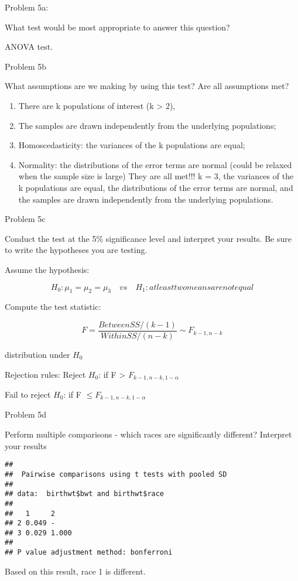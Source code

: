 \documentclass[
]{article}
\newenvironment{Shaded}{\begin{snugshade}}{\end{snugshade}}
\newcommand{\AttributeTok}[1]{\textcolor[rgb]{0.13,0.29,0.53}{#1}}
\newcommand{\FunctionTok}[1]{\textcolor[rgb]{0.13,0.29,0.53}{\textbf{#1}}}
\newcommand{\NormalTok}[1]{#1}
\newcommand{\SpecialCharTok}[1]{\textcolor[rgb]{0.81,0.36,0.00}{\textbf{#1}}}
\newcommand{\StringTok}[1]{\textcolor[rgb]{0.31,0.60,0.02}{#1}}
\providecommand{\tightlist}{%
  \setlength{\itemsep}{0pt}\setlength{\parskip}{0pt}}
\begin{document}
Problem 5a:

What test would be most appropriate to answer this question?

ANOVA test.

Problem 5b

What assumptions are we making by using this test? Are all assumptions
met?

\begin{enumerate}
\def\labelenumi{\arabic{enumi}.}
\tightlist
\item
  There are k populations of interest (k \textgreater{} 2),
\item
  The samples are drawn independently from the underlying populations;
\item
  Homoscedasticity: the variances of the k populations are equal;
\item
  Normality: the distributions of the error terms are normal (could be
  relaxed when the sample size is large) They are all met!!! k = 3, the
  variances of the k populations are equal, the distributions of the
  error terms are normal, and the samples are drawn independently from
  the underlying populations.
\end{enumerate}

Problem 5c

Conduct the test at the 5\% significance level and interpret your
results. Be sure to write the hypotheses you are testing.

Assume the hypothesis:

\[H_0 : \mu_1 = \mu_2 = \mu_3 \quad vs \quad H_1 : at least two means are not equal\]

Compute the test statistic:

\[F = {\frac{BetweenSS/(k-1)}{WithinSS/(n-k)}}\sim F_{k-1,n-k}\]

distribution under \(H_0\)

Rejection rules: Reject \(H_0\): if F \textgreater{}
\(F_{k-1,n-k,1-\alpha}\)

Fail to reject \(H_0\): if F \(\leqslant F_{k-1,n-k,1-\alpha}\)

Problem 5d

Perform multiple comparisons - which races are significantly different?
Interpret your results

\begin{Shaded}
\end{Shaded}

\begin{verbatim}
## 
##  Pairwise comparisons using t tests with pooled SD 
## 
## data:  birthwt$bwt and birthwt$race 
## 
##   1     2    
## 2 0.049 -    
## 3 0.029 1.000
## 
## P value adjustment method: bonferroni
\end{verbatim}

Based on this result, race 1 is different.
\end{document}
